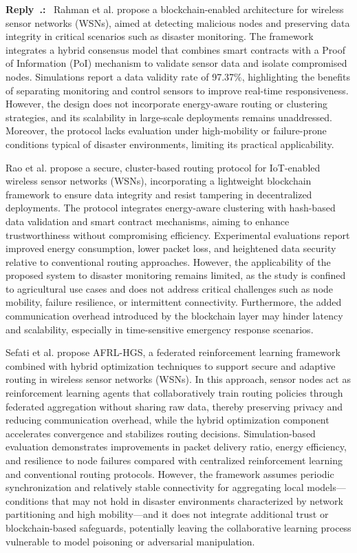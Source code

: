 \documentclass[11pt]{article}
\newcounter{reviewer}
\newcounter{replyctr}[reviewer]
\renewcommand{\thereplyctr}{\thereviewer.\arabic{replyctr}}
\newenvironment{reply}
  {\refstepcounter{replyctr}%
   \addtocounter{replyctr}{-1}%
   \medskip\noindent
   \begin{sf}\textbf{Reply~\thereplyctr:}\ }
  {\addtocounter{replyctr}{1}%
   \medskip\end{sf}}
\begin{document}
\begin{refsection}
\begin{mdframed}[style=Resp]
\begin{reply}
Rahman et al. \cite{rahman_distributed_2025} propose a blockchain-enabled architecture for wireless sensor networks (WSNs), aimed at detecting malicious nodes and preserving data integrity in critical scenarios such as disaster monitoring. The framework integrates a hybrid consensus model that combines smart contracts with a Proof of Information (PoI) mechanism to validate sensor data and isolate compromised nodes. Simulations report a data validity rate of 97.37\%, highlighting the benefits of separating monitoring and control sensors to improve real-time responsiveness. However, the design does not incorporate energy-aware routing or clustering strategies, and its scalability in large-scale deployments remains unaddressed. Moreover, the protocol lacks evaluation under high-mobility or failure-prone conditions typical of disaster environments, limiting its practical applicability.

Rao et al. \cite{rao_optimized_2024} propose a secure, cluster-based routing protocol for IoT-enabled wireless sensor networks (WSNs), incorporating a lightweight blockchain framework to ensure data integrity and resist tampering in decentralized deployments. The protocol integrates energy-aware clustering with hash-based data validation and smart contract mechanisms, aiming to enhance trustworthiness without compromising efficiency. Experimental evaluations report improved energy consumption, lower packet loss, and heightened data security relative to conventional routing approaches. However, the applicability of the proposed system to disaster monitoring remains limited, as the study is confined to agricultural use cases and does not address critical challenges such as node mobility, failure resilience, or intermittent connectivity. Furthermore, the added communication overhead introduced by the blockchain layer may hinder latency and scalability, especially in time-sensitive emergency response scenarios.

Sefati et al. \cite{sefati_federated_2025} propose AFRL-HGS, a federated reinforcement learning framework combined with hybrid optimization techniques to support secure and adaptive routing in wireless sensor networks (WSNs). In this approach, sensor nodes act as reinforcement learning agents that collaboratively train routing policies through federated aggregation without sharing raw data, thereby preserving privacy and reducing communication overhead, while the hybrid optimization component accelerates convergence and stabilizes routing decisions. Simulation-based evaluation demonstrates improvements in packet delivery ratio, energy efficiency, and resilience to node failures compared with centralized reinforcement learning and conventional routing protocols. However, the framework assumes periodic synchronization and relatively stable connectivity for aggregating local models—conditions that may not hold in disaster environments characterized by network partitioning and high mobility—and it does not integrate additional trust or blockchain-based safeguards, potentially leaving the collaborative learning process vulnerable to model poisoning or adversarial manipulation.



\end{reply}
\end{mdframed}
\end{refsection}
\end{document}

